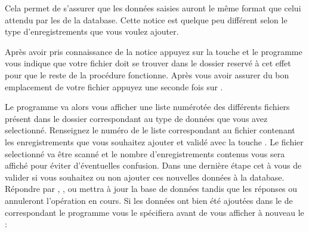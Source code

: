 \documentclass[letterpaper,10pt,french]{sphinxmanual}
\begin{document}
\sphinxAtStartPar
Cela permet de s’assurer que les données saisies auront le même format que celui attendu par les  de la database. Cette
notice est quelque peu différent selon le type d’enregistrements que vous voulez ajouter.

\sphinxAtStartPar
Après avoir pris connaissance de la notice appuyez sur la touche  et le programme vous indique que votre fichier
doit se trouver dans le dossier  reservé à cet effet pour que le reste de la procédure fonctionne. Après vous avoir assurer
du bon emplacement de votre fichier appuyez une seconde fois sur .

\sphinxAtStartPar
Le programme va alors vous afficher une liste numérotée des différents fichiers présent dans le dossier  correspondant au type de données
que vous avez selectionné. Renseignez le numéro de le liste correspondant au fichier contenant les enregistrements que vous souhaitez ajouter et validé
avec la touche . Le fichier selectionné va être scanné et le nombre d’enregistrements contenus vous sera affiché pour éviter d’éventuelles
confusion. Dans une dernière étape cet à vous de valider si vous souhaitez ou non ajouter ces nouvelles données à la database. Répondre par ,
,  ou  mettra à jour la base de données tandis que les réponses  ou  annuleront l’opération en cours. Si les données ont bien été
ajoutées dans le  de  correspondant le programme vous le spécifiera avant de vous afficher à nouveau le :
\end{document}

